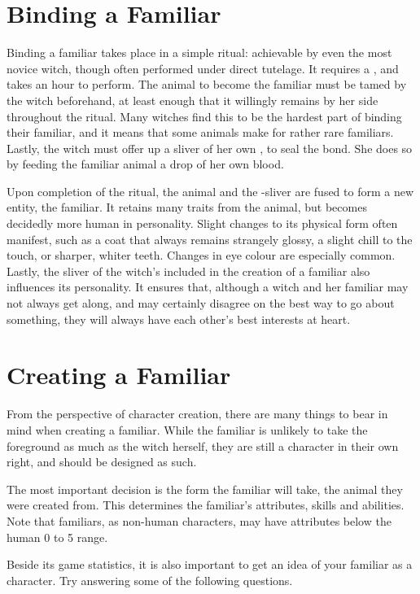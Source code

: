 \section{Binding a Familiar}

Binding a familiar takes place in a simple ritual: achievable by even the most novice witch, though often performed under direct tutelage.
It requires a , and takes an hour to perform.
The animal to become the familiar must be tamed by the witch beforehand, at least enough that it willingly remains by her side throughout the ritual.
Many witches find this to be the hardest part of binding their familiar, and it means that some animals make for rather rare familiars.
Lastly, the witch must offer up a sliver of her own {\soul}, to seal the bond.
She does so by feeding the familiar animal a drop of her own blood.

Upon completion of the ritual, the animal and the {\soul}-sliver are fused to form a new entity, the familiar.
It retains many traits from the animal, but becomes decidedly more human in personality.
Slight changes to its physical form often manifest, such as a coat that always remains strangely glossy, a slight chill to the touch, or sharper, whiter teeth.
Changes in eye colour are especially common.
Lastly, the sliver of the witch's {\soul} included in the creation of a familiar also influences its personality.
It ensures that, although a witch and her familiar may not always get along, and may certainly disagree on the best way to go about something, they will always have each other's best interests at heart.

\section{Creating a Familiar}

From the perspective of character creation, there are many things to bear in mind when creating a familiar.
While the familiar is unlikely to take the foreground as much as the witch herself, they are still a character in their own right, and should be designed as such.

The most important decision is the form the familiar will take, the animal they were created from.
This determines the familiar's attributes, skills and abilities.
Note that familiars, as non-human characters, may have attributes below the human 0 to 5 range.

Beside its game statistics, it is also important to get an idea of your familiar as a character.
Try answering some of the following questions.

